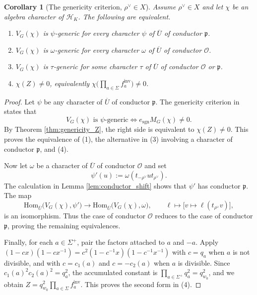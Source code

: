 \documentclass[12pt]{article}
\numberwithin{equation}{section}
\newtheorem{corollary}[theorem]{Corollary}
\theoremstyle{definition}
\theoremstyle{remark}
\theoremstyle{plain}
\begin{document}
\begin{corollary}[The genericity criterion, $\rho^\vee \in X$]\label{cor:genericity}
Assume $\rho^\vee \in X$ and let $\chi$ be an algebra character of $\mathcal{H}_K$. The following are equivalent.
\begin{enumerate}
\item $V_G(\chi)$ is $\psi$-generic for every character $\psi$ of $\overline{U}$ of conductor $\mathfrak{p}$.
\item $V_G(\chi)$ is $\omega$-generic for every character $\omega$ of $\overline{U}$ of conductor $\mathcal{O}$.
\item $V_G(\chi)$ is $\tau$-generic for some character $\tau$ of $\overline U$ of conductor $\mathcal O$ or $\mathfrak p$.
\item $\chi(Z) \neq 0$, equivalently $\displaystyle \chi\Big(\prod_{a\in\Sigma}f_a^{\mathrm{inv}}\Big) \neq 0$.
\end{enumerate}
\end{corollary}
\begin{proof}
Let $\psi$ be any character of $\overline{U}$ of conductor $\mathfrak{p}$. The genericity criterion in \cite[Corollary 5.2]{LuoGCS} states that
$$V_G(\chi)\text{ is }\psi\text{-generic}\iff e_{\mathrm{sgn}}M_G(\chi)\neq0.$$
By Theorem \ref{thm:genericity_Z}, the right side is equivalent to $\chi(Z)\neq0$. This proves the equivalence of (1), the alternative in (3) involving a character of conductor $\mathfrak{p}$, and (4).

Now let $\omega$ be a character of $\overline U$ of conductor $\mathcal{O}$ and set
$$\psi'(u):=\omega(t_{-\rho^\vee}ut_{\rho^\vee}).$$
The calculation in Lemma \ref{lem:conductor_shift} shows that $\psi'$ has conductor $\mathfrak p$. The map
$$\mathrm{Hom}_{\overline U}\big(V_G(\chi),\psi'\big)\longrightarrow
\mathrm{Hom}_{\overline U}\big(V_G(\chi),\omega\big),\qquad
\ell\longmapsto\big[v\mapsto\ell(t_{\rho^\vee}v)\big],$$
is an isomorphism. Thus the case of conductor $\mathcal O$ reduces to the case of conductor $\mathfrak p$, proving the remaining equivalences.

Finally, for each $a\in\Sigma^+$, pair the factors attached to $a$ and $-a$. Apply $(1-cx)(1-cx^{-1}) = c^2(1-c^{-1}x)(1-c^{-1}x^{-1})$ with $c=q_a$ when $a$ is not divisible, and with $c=c_1(a)$ and $c=-c_2(a)$ when $a$ is divisible. Since $c_1(a)^2c_2(a)^2 = q_a^2$, the accumulated constant is $\prod_{a\in\Sigma^+}q_a^2 = q_{w_0}^2$, and we obtain $Z = q_{w_0}^2\prod_{a\in\Sigma}f_a^{\mathrm{inv}}$. This proves the second form in (4).
\end{proof}
\end{document}
